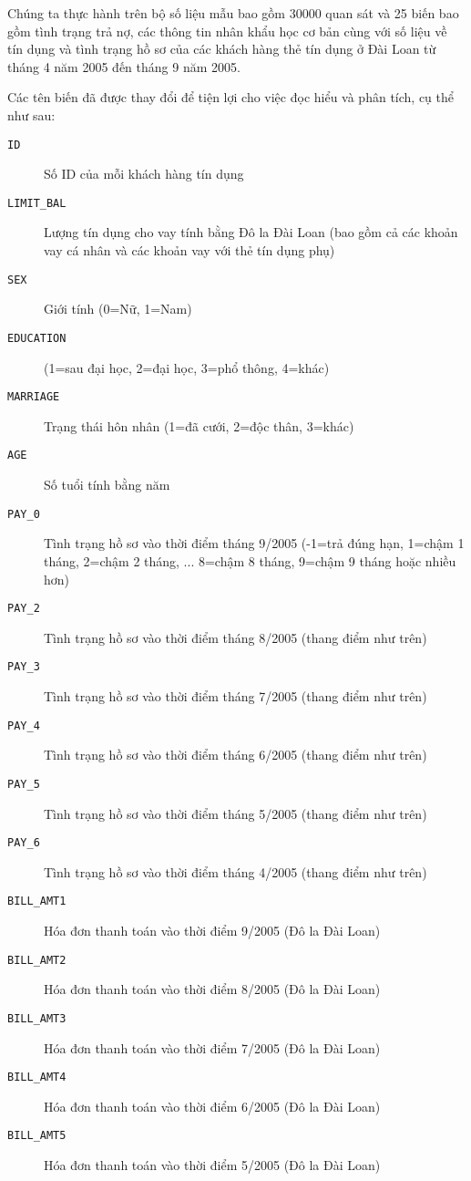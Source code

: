 Chúng ta thực hành trên bộ số liệu mẫu bao gồm 30000 quan sát và 25 biến bao gồm tình trạng trả nợ, các thông tin nhân khẩu học cơ bản cùng với số liệu về tín dụng và tình trạng hồ sơ của các khách hàng thẻ tín dụng ở Đài Loan từ tháng 4 năm 2005 đến tháng 9 năm 2005.

Các tên biến đã được thay đổi để tiện lợi cho việc đọc hiểu và phân tích, cụ thể như sau:

\begin{description}
  \item [\texttt{ID}] Số ID của mỗi khách hàng tín dụng
  \item [\texttt{LIMIT\_BAL}] Lượng tín dụng cho vay tính bằng Đô la Đài Loan (bao gồm cả các khoản vay cá nhân và các khoản vay với thẻ tín dụng phụ)
  \item [\texttt{SEX}] Giới tính (0=Nữ, 1=Nam)
  \item [\texttt{EDUCATION}] (1=sau đại học, 2=đại học, 3=phổ thông, 4=khác)
  \item [\texttt{MARRIAGE}] Trạng thái hôn nhân (1=đã cưới, 2=độc thân, 3=khác)
  \item [\texttt{AGE}] Số tuổi tính bằng năm
  \item [\texttt{PAY\_0}] Tình trạng hồ sơ vào thời điểm tháng 9/2005 (-1=trả đúng hạn, 1=chậm 1 tháng, 2=chậm 2 tháng, ... 8=chậm 8 tháng, 9=chậm 9 tháng hoặc nhiều hơn)
  \item [\texttt{PAY\_2}] Tình trạng hồ sơ vào thời điểm tháng 8/2005 (thang điểm như trên)
  \item [\texttt{PAY\_3}] Tình trạng hồ sơ vào thời điểm tháng 7/2005 (thang điểm như trên)
  \item [\texttt{PAY\_4}] Tình trạng hồ sơ vào thời điểm tháng 6/2005 (thang điểm như trên)
  \item [\texttt{PAY\_5}] Tình trạng hồ sơ vào thời điểm tháng 5/2005 (thang điểm như trên)
  \item [\texttt{PAY\_6}] Tình trạng hồ sơ vào thời điểm tháng 4/2005 (thang điểm như trên)
  \item [\texttt{BILL\_AMT1}] Hóa đơn thanh toán vào thời điểm 9/2005 (Đô la Đài Loan)
  \item [\texttt{BILL\_AMT2}] Hóa đơn thanh toán vào thời điểm 8/2005 (Đô la Đài Loan)
  \item [\texttt{BILL\_AMT3}] Hóa đơn thanh toán vào thời điểm 7/2005 (Đô la Đài Loan)
  \item [\texttt{BILL\_AMT4}] Hóa đơn thanh toán vào thời điểm 6/2005 (Đô la Đài Loan)
  \item [\texttt{BILL\_AMT5}] Hóa đơn thanh toán vào thời điểm 5/2005 (Đô la Đài Loan)

\end{description}
